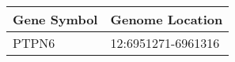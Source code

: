\begin{tabular}{ll}
\toprule
Gene Symbol &    Genome Location \\
\midrule
      PTPN6 & 12:6951271-6961316 \\
\bottomrule
\end{tabular}
